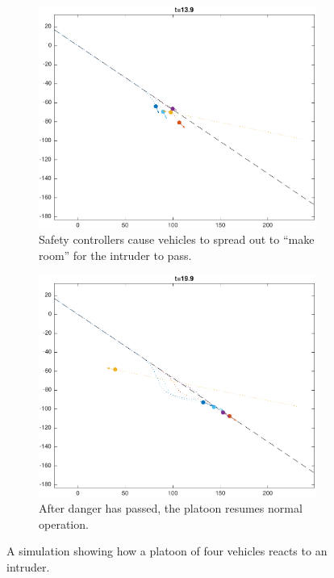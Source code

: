 \begin{figure}[h!]
    \begin{subfigure}[t]{0.9\columnwidth} \label{subfig:in_140}
        \includegraphics[width=\columnwidth]{in_140}
        \caption{Safety controllers cause vehicles to spread out to ``make room'' for the intruder to pass.}
    \end{subfigure}
    \begin{subfigure}[t]{0.9\columnwidth} \label{subfig:in_200}
        \includegraphics[width=\columnwidth]{in_200}
        \caption{After danger has passed, the platoon resumes normal operation.}
    \end{subfigure}   
    \caption{A simulation showing how a platoon of four vehicles reacts to an intruder. \label{fig:in}}
\end{figure}

